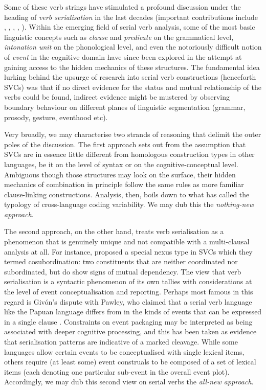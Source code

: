 Some of these verb strings have stimulated a profound discussion under the heading of \emph{verb serialisation} in the last decades (important contributions include \citealt{sebba1987syntax}, \citealt{Durie1997}, \citealt{Aikhenvald2006}, \citealt{foley2010events}, \citealt{haspelmath2016serial}). Within the emerging field of serial verb analysis, some of the most basic linguistic concepts such as \emph{clause} and \emph{predicate} on the grammatical level, \emph{intonation unit} on the phonological level, and even the notoriously difficult notion of \emph{event} in the cognitive domain have since been explored in the attempt at gaining access to the hidden mechanics of these structures. The fundamental idea lurking behind the upsurge of research into serial verb constructions (henceforth SVCs) was that if no direct evidence for the status and mutual relationship of the verbs could be found, indirect evidence might be mustered by observing boundary behaviour on different planes of linguistic segmentation (grammar, prosody, gesture, eventhood etc). 

Very broadly, we may characterise two strands of reasoning that delimit the outer poles of the discussion. The first approach sets out from the assumption that SVCs are in essence little different from homologous construction types in other languages, be it on the level of syntax or on the cognitive-conceptual level. Ambiguous though those structures may look on the surface, their hidden mechanics of combination in principle follow the same rules as more familiar clause-linking constructions. Analysis, then, boils down to what \citet{givon1991serial} has called the typology of cross-language coding variability. We may dub this the \textit{nothing-new approach}. 

The second approach, on the other hand, treats verb serialisation as a phenomenon that is genuinely unique and not compatible with a multi-clausal analysis at all. For instance, \citet{foley1984functional} proposed a special nexus type in SVCs which they termed cosubordination: two constituents that are neither coordinated nor subordinated, but do show signs of mutual dependency. The view that verb serialisation is a syntactic phenomenon of its own tallies with considerations at the level of event conceptualisation and reporting. Perhaps most famous in this regard is Givón's dispute with Pawley, who claimed that a serial verb language like the Papuan language  differs from  in the kinds of events that can be expressed in a single clause \citep{Pawley1987, pawley2011event}. Constraints on event packaging may be interpreted as being associated with deeper cognitive processing, and this has been taken as evidence that serialisation patterns are indicative of a marked cleavage. While some languages  allow certain events to be conceptualised with single lexical items, others require (at least some) event construals to be composed of a set of lexical items (each denoting one particular sub-event in the overall event plot). Accordingly, we may dub this second view on serial verbs the \textit{all-new approach}.

